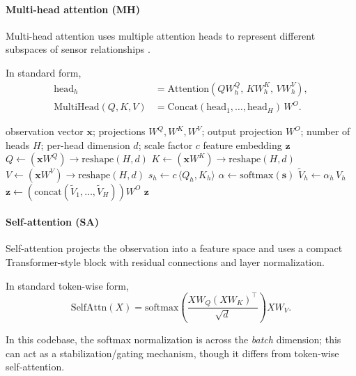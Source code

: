 \documentclass[sn-basic]{sn-jnl} %
\begin{document}
\paragraph{Multi-head attention (MH)}
Multi-head attention uses multiple attention heads to represent different subspaces of sensor relationships \cite{Vaswani2017}.

In standard form,
\begin{align}
\mathrm{head}_h &= \mathrm{Attention}(QW_h^Q,\,KW_h^K,\,VW_h^V),\\
\mathrm{MultiHead}(Q,K,V) &= \mathrm{Concat}(\mathrm{head}_1,\ldots,\mathrm{head}_H)\,W^O.
\end{align}

\begin{algorithm}[t]
\caption{Multi-head attention feature extractor (forward pass; head-gating over $H$ heads)}
\label{alg:mh_forward}
\begin{algorithmic}[1]
\Require observation vector $\mathbf{x}$; projections $W^Q,W^K,W^V$; output projection $W^O$; number of heads $H$; per-head dimension $d$; scale factor $c$
\Ensure feature embedding $\mathbf{z}$
\State $Q \gets (\mathbf{x}W^Q) \rightarrow \text{reshape}(H, d)$
\State $K \gets (\mathbf{x}W^K) \rightarrow \text{reshape}(H, d)$
\State $V \gets (\mathbf{x}W^V) \rightarrow \text{reshape}(H, d)$
		\State $s_h \gets c\,\langle Q_h, K_h\rangle$
\EndFor
\State $\alpha \gets \mathrm{softmax}(\mathbf{s})$ 
		\State $\tilde{V}_h \gets \alpha_h\,V_h$
\EndFor
\State $\mathbf{z} \gets (\mathrm{concat}(\tilde{V}_1,\ldots,\tilde{V}_H))W^O$
\State \Return $\mathbf{z}$
\end{algorithmic}
\end{algorithm}

\paragraph{Self-attention (SA)}
Self-attention projects the observation into a feature space and uses a compact Transformer-style block with residual connections and layer normalization.

In standard token-wise form,
\begin{equation}
\mathrm{SelfAttn}(X)=\mathrm{softmax}\left(\frac{XW_Q(XW_K)^\top}{\sqrt{d}}\right)XW_V.
\end{equation}

In this codebase, the softmax normalization is across the \emph{batch} dimension; this can act as a stabilization/gating mechanism, though it differs from token-wise self-attention.
\end{document}
